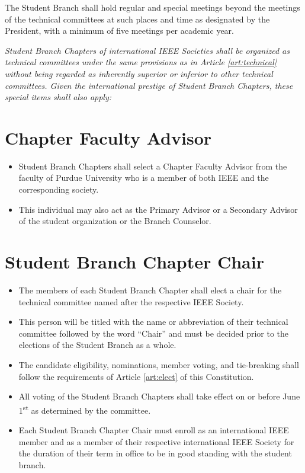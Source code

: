 \documentclass[12pt]{constitution}
\newcommand{\datetermstart}{June 1\textsuperscript{st}} %
\begin{document}
\label{art:meet}

The Student Branch shall hold regular and special meetings beyond the meetings of the technical committees at such places and time as designated by the President, with a minimum of five meetings per academic year.


\label{art:sbc}

\textit{Student Branch Chapters of international IEEE Societies shall be organized as technical committees under the same provisions as in Article \ref{art:technical} without being regarded as inherently superior or inferior to other technical committees. Given the international prestige of Student Branch Chapters, these special items shall also apply:}

\section{Chapter Faculty Advisor}
\label{sec:sbc_cfa}
\begin{itemize}
    \item Student Branch Chapters shall select a Chapter Faculty Advisor from the faculty of Purdue University who is a member of both IEEE and the corresponding society.
    \item This individual may also act as the Primary Advisor or a Secondary Advisor of the student organization or the Branch Counselor.
\end{itemize}

\section{Student Branch Chapter Chair}
\label{sec:sbc_chair}
\begin{itemize}
    \item The members of each Student Branch Chapter shall elect a chair for the technical committee named after the respective IEEE Society.
    \item This person will be titled with the name or abbreviation of their technical committee followed by the word ``Chair'' and must be decided prior to the elections of the Student Branch as a whole.
    \item The candidate eligibility, nominations, member voting, and tie-breaking shall follow the requirements of Article \ref{art:elect} of this Constitution.
    \item All voting of the Student Branch Chapters shall take effect on or before \datetermstart{} as determined by the committee.
    \item Each Student Branch Chapter Chair must enroll as an international IEEE member and as a member of their respective international IEEE Society for the duration of their term in office to be in good standing with the student branch.
\end{itemize}
\end{document}
